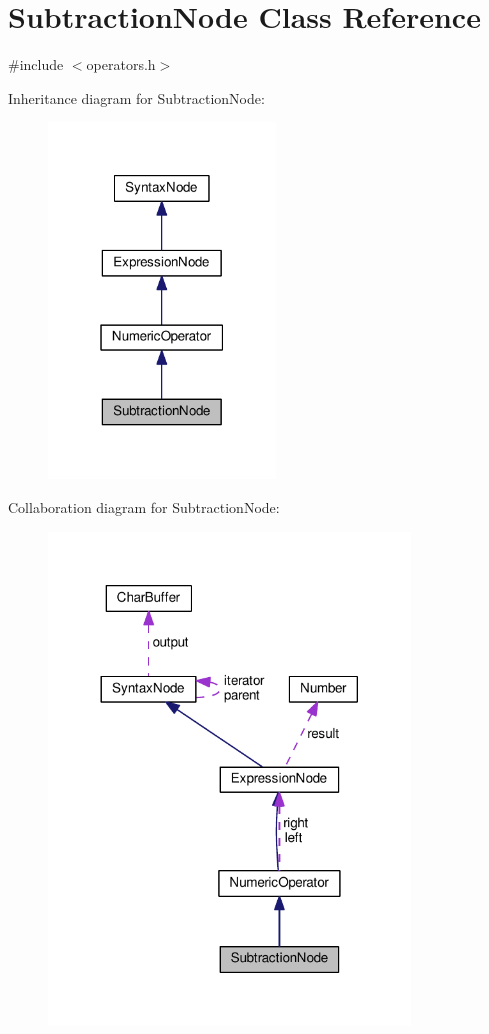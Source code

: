 \hypertarget{classSubtractionNode}{}\section{Subtraction\+Node Class Reference}
\label{classSubtractionNode}


{\ttfamily \#include $<$operators.\+h$>$}



Inheritance diagram for Subtraction\+Node\+:
\nopagebreak
\begin{figure}[H]
\begin{center}
\leavevmode
\includegraphics[width=171pt]{dd/d42/classSubtractionNode__inherit__graph}
\end{center}
\end{figure}


Collaboration diagram for Subtraction\+Node\+:
\nopagebreak
\begin{figure}[H]
\begin{center}
\leavevmode
\includegraphics[width=272pt]{de/d43/classSubtractionNode__coll__graph}
\end{center}
\end{figure}
